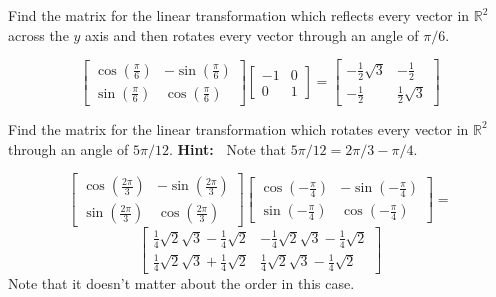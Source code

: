 \documentclass{ximera}
\begin{document}
\begin{problem}\label{prb:6.23} Find the matrix for the linear transformation which reflects every
vector in $\mathbb{R}^{2}$ across the $y$ axis and then rotates every vector
through an angle of $\pi /6$.
\begin{hint}
\[
\left[
\begin{array}{cc}
\cos \left( \frac{\pi }{6}\right)  & -\sin \left( \frac{\pi }{6}\right)  \\
\sin \left( \frac{\pi }{6}\right)  & \cos \left( \frac{\pi }{6}\right)
\end{array}
\right] \left[
\begin{array}{rr}
-1 & 0 \\
0 & 1
\end{array}
\right] = \left[
\begin{array}{cc}
-\frac{1}{2}\sqrt{3} & -\frac{1}{2} \\
-\frac{1}{2} & \frac{1}{2}\sqrt{3}
\end{array}
\right]
\]
\end{hint}
\end{problem}

\begin{problem}\label{prb:6.24} Find the matrix for the linear transformation which rotates every
vector in $\mathbb{R}^{2}$ through an angle of $5\pi /12.$ \textbf{Hint:\ }
Note that $5\pi /12=2\pi /3-\pi /4.$
\begin{hint}
\[
\left[
\begin{array}{cc}
\cos \left( \frac{2\pi }{3}\right) & -\sin \left( \frac{2\pi }{3}\right) \\
\sin \left( \frac{2\pi }{3}\right) & \cos \left( \frac{2\pi }{3}\right)
\end{array}
\right] \left[
\begin{array}{cc}
\cos \left( -\frac{\pi }{4}\right) & -\sin \left( -\frac{\pi }{4}\right) \\
\sin \left( -\frac{\pi }{4}\right) & \cos \left( -\frac{\pi }{4}\right)
\end{array}
\right] =
\]
\[
\left[
\begin{array}{cc}
\frac{1}{4}\sqrt{2}\sqrt{3}-\frac{1}{4}\sqrt{2} & -\frac{1}{4}\sqrt{2}\sqrt{3
}-\frac{1}{4}\sqrt{2} \\
\frac{1}{4}\sqrt{2}\sqrt{3}+\frac{1}{4}\sqrt{2} & \frac{1}{4}\sqrt{2}\sqrt{3}
-\frac{1}{4}\sqrt{2}
\end{array}
\right]
\]
Note that it doesn't matter about the order in this case.
\end{hint}
\end{problem}
\end{document}
